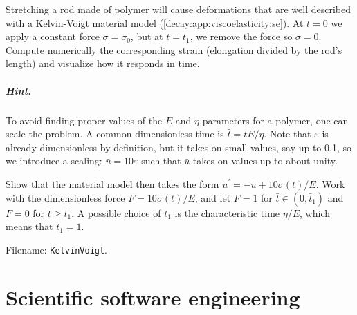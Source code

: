 \documentclass[graybox,sectrefs,envcountresetchap,open=right,final]{svmonodo}
\makeatletter
\newenvironment{doconceexercise}{}{}
\newcounter{doconceexercisecounter}%
\newcommand\listofexercises{
\chapter*{List of Exercises, Problems, and Projects
          \@mkboth{List of Exercises, Problems, and Projects}{List of Exercises, Problems, and Projects}}
\markboth{List of Exercises, Problems, and Projects}{List of Exercises, Problems, and Projects}
\@starttoc{loe}
}
\makeatother
\begin{document}
\begin{doconceexercise}

                
\label{decay:app:exer:viscoelasticity1}

Stretching a rod made of polymer will cause deformations that are
well described with a Kelvin-Voigt material model
(\ref{decay:app:viscoelasticity:se}). At $t=0$ we apply a constant
force $\sigma = \sigma_0$, but at $t=t_1$, we remove the force
so $\sigma=0$. Compute numerically the corresponding strain
(elongation divided by the rod's length) and visualize how it
responds in time.


\paragraph{Hint.}
To avoid finding proper values of the $E$ and $\eta$ parameters for
a polymer, one can scale the problem. A common dimensionless
time is $\bar t= tE/\eta$. Note that $\varepsilon$ is already
dimensionless by definition, but it takes on small values, say up to 0.1,
so we introduce a scaling: $\bar u=10\varepsilon$ such that $\bar u$
takes on values up to about unity.

Show that the material model then
takes the form $\bar u^{\prime} = -\bar u + 10\sigma(t)/E$.
Work with the dimensionless force $F=10\sigma(t)/E$, and let
$F=1$ for $\bar t\in (0,\bar t_1)$ and $F=0$ for $\bar t\geq \bar t_1$.
A possible choice of $t_1$ is the characteristic time $\eta/E$, which
means that $\bar t_1 = 1$.


\noindent Filename: \texttt{KelvinVoigt}.

\end{doconceexercise}

\chapter{Scientific software engineering}
\label{decay:se}
\end{document}
